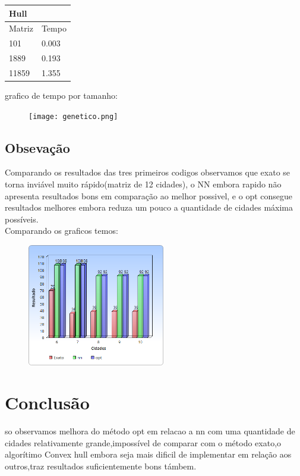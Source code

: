 \documentclass[a4paper,10pt]{article}
\begin{document}
\begin{table}[]
\centering
\label{Hull}
\begin{tabular}{|ll|}
\hline
Hull                         &       \\ \hline
\multicolumn{1}{|l|}{Matriz} & Tempo \\ \hline
\multicolumn{1}{|l|}{101}    & 0.003 \\ \hline
\multicolumn{1}{|l|}{1889}   & 0.193 \\ \hline
\multicolumn{1}{|l|}{11859}  & 1.355 \\ \hline
\end{tabular}
\end{table}
  
     grafico de tempo por tamanho: 
   
   \begin{figure}[!htb]
   \texttt{[image: genetico.png]}
   \end{figure}
 \subsection{Obsevação}
  Comparando os resultados das tres primeiros codigos observamos que exato se torna inviável muito rápido(matriz de 12 cidades), o NN 
  embora rapido não apresenta resultados bons em comparação ao melhor possivel, e o opt consegue resultados melhores embora reduza um pouco a quantidade de cidades máxima possíveis. \\
  Comparando os graficos temos:
  
     \begin{figure}[!htb]
   \includegraphics[width=6cm]{comparacao.png}
   \end{figure}

 \section{Conclusão}
 so observamos melhora do método opt em relacao a nn com uma quantidade de cidades relativamente grande,impossível de comparar com o método exato,o algorítimo Convex hull embora seja mais dificil de implementar em relação aos outros,traz resultados suficientemente bons támbem.
 
\end{document}
